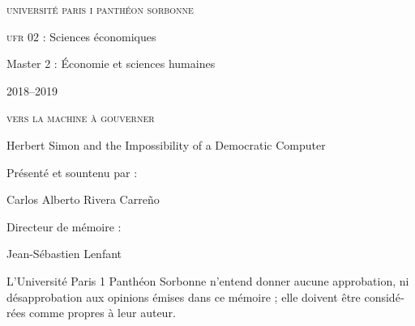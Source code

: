 \documentclass[version=last,draft=true,paper=A4,portrait,twoside=true,twocolumn=false,headinclude=false,footinclude=false,fontsize=12,BCOR=20mm,DIV=calc,pagesize=auto,titlepage=firstiscover,mpinclude=true,open=right,chapterprefix=true,numbers=autoendperiod,headsepline=false,headings=twolinechapter,parskip=false]{scrbook}
\author{Carlos Alberto Rivera Carreño}
\date{}
\title{}
\begin{document}


\begin{titlepage}
 \centering
\begin{french}
 {\large \textsc{université paris i panthéon sorbonne} \par}
  \vspace*{0.01\textheight}
 {\large \textsc{ufr} 02 : Sciences économiques  \par}
  \vspace*{0.01\textheight}
 {\large Master 2 : Économie et sciences humaines \par}
  \vspace*{0.01\textheight}
 {\large 2018--2019 \par}
\end{french}
  \vspace*{0.3\textheight}
 {\huge \textsc{vers la machine à gouverner}  \par}
  \vspace*{0.02\textheight}
 {\Large Herbert Simon and the Impossibility of a Democratic Computer \par}
\vfill
\begin{french}
 {\large Présenté et sountenu par : \par}
\end{french}
 {\Large Carlos Alberto Rivera Carreño \par}
  \vspace*{0.05\textheight}
\begin{french}
 {\large Directeur de mémoire : \par}
\end{french}
 {\Large Jean-Sébastien Lenfant \par}
\end{titlepage}

\pagestyle{empty}

\begin{french}
L'Université Paris 1 Panthéon Sorbonne n'entend donner aucune approbation,
ni désapprobation aux opinions émises dans ce mémoire ; elle doivent être
considérées comme propres à leur auteur. 
\end{french}
\vfill
\end{document}
